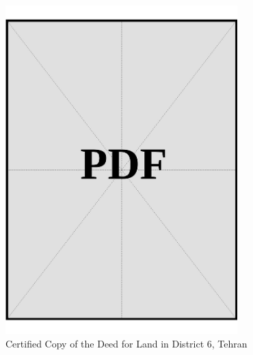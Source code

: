 \vspace*{\fill}
\begin{figure}[h]
    \centering
    \includegraphics[page=1, width=0.8\textwidth]{../application-docs/applicant/funds/property-deeds/property-1/certified-copies.pdf}
    \caption{Certified Copy of the Deed for Land in District 6, Tehran}
    \label{fig:applicant-land-dist6-tehran-certified-copy}
\end{figure}
\vspace*{\fill}

\clearpage